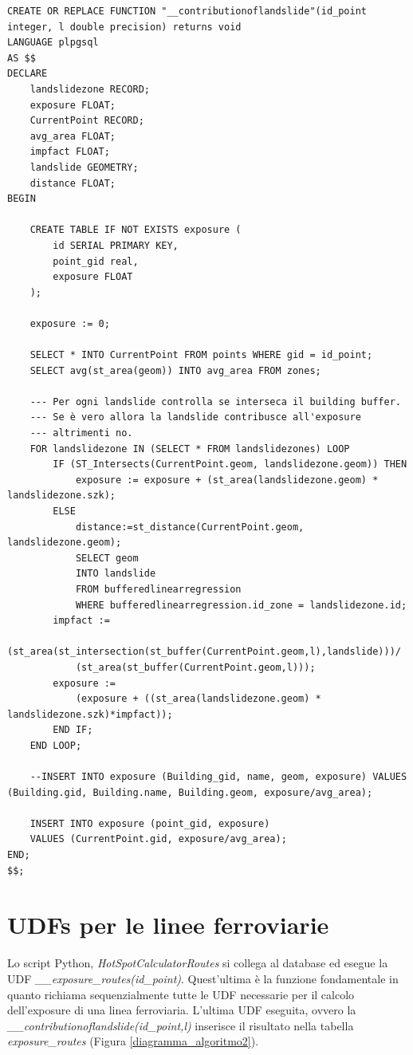 \begin{lstlisting}[style = mystyle]
CREATE OR REPLACE FUNCTION "__contributionoflandslide"(id_point integer, l double precision) returns void
LANGUAGE plpgsql
AS $$
DECLARE
	landslidezone RECORD;
	exposure FLOAT;
	CurrentPoint RECORD;
	avg_area FLOAT;
	impfact FLOAT;
	landslide GEOMETRY;
	distance FLOAT;
BEGIN

	CREATE TABLE IF NOT EXISTS exposure (
		id SERIAL PRIMARY KEY,
		point_gid real,
		exposure FLOAT
	);

	exposure := 0;
	
	SELECT * INTO CurrentPoint FROM points WHERE gid = id_point;
	SELECT avg(st_area(geom)) INTO avg_area FROM zones;
	
	--- Per ogni landslide controlla se interseca il building buffer.
	--- Se è vero allora la landslide contribusce all'exposure
	--- altrimenti no.
	FOR landslidezone IN (SELECT * FROM landslidezones) LOOP
		IF (ST_Intersects(CurrentPoint.geom, landslidezone.geom)) THEN
			exposure := exposure + (st_area(landslidezone.geom) * landslidezone.szk);
		ELSE
			distance:=st_distance(CurrentPoint.geom, landslidezone.geom);
			SELECT geom 
			INTO landslide 
			FROM bufferedlinearregression 
			WHERE bufferedlinearregression.id_zone = landslidezone.id;
		impfact :=
			(st_area(st_intersection(st_buffer(CurrentPoint.geom,l),landslide)))/
			(st_area(st_buffer(CurrentPoint.geom,l)));
		exposure := 
			(exposure + ((st_area(landslidezone.geom) * landslidezone.szk)*impfact));
		END IF;
	END LOOP;

	--INSERT INTO exposure (Building_gid, name, geom, exposure) VALUES (Building.gid, Building.name, Building.geom, exposure/avg_area);
	
	INSERT INTO exposure (point_gid, exposure) 
	VALUES (CurrentPoint.gid, exposure/avg_area);
END;
$$;
\end{lstlisting}

\newpage

\section{UDFs per le linee ferroviarie}

Lo script Python, \textit{HotSpotCalculatorRoutes} si collega al database ed esegue la UDF  \textit{\_\_exposure\_routes(id\_point)}. Quest'ultima è la funzione fondamentale in quanto richiama sequenzialmente tutte le UDF necessarie per il calcolo dell'exposure di una linea ferroviaria. L'ultima UDF eseguita, ovvero la \textit{\_\_contributionoflandslide(id\_point,l)} inserisce il risultato nella tabella \textit{exposure\_routes} (Figura \ref{diagramma_algoritmo2}).


